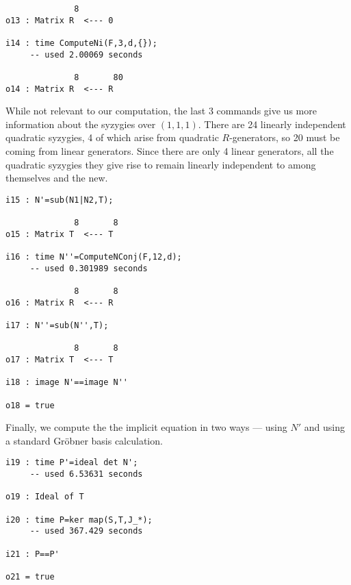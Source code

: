 \documentclass[fleqn,reqno]{amsart}
\begin{document}
\begin{example}[$\mt{ex601}$]
\begin{verbatim}
              8
o13 : Matrix R  <--- 0

i14 : time ComputeNi(F,3,d,{});
     -- used 2.00069 seconds

              8       80
o14 : Matrix R  <--- R
\end{verbatim}
While not relevant to our computation, the last 3 commands give us more information
about the syzygies over $(1,1,1)$.
There are 24 linearly independent quadratic syzygies,
4 of which arise from quadratic $R$-generators, so 20 must be coming from linear generators.
Since there are only 4 linear generators, all the quadratic syzygies they give rise to
remain linearly independent to among themselves and the new.

\begin{verbatim}
i15 : N'=sub(N1|N2,T);

              8       8
o15 : Matrix T  <--- T

i16 : time N''=ComputeNConj(F,12,d);
     -- used 0.301989 seconds

              8       8
o16 : Matrix R  <--- R

i17 : N''=sub(N'',T);

              8       8
o17 : Matrix T  <--- T

i18 : image N'==image N''

o18 = true
\end{verbatim}
Finally, we compute the the implicit equation in two ways --- using $N'$ and
using a standard Gr\"obner basis calculation.

\begin{verbatim}
i19 : time P'=ideal det N';
     -- used 6.53631 seconds

o19 : Ideal of T

i20 : time P=ker map(S,T,J_*);
     -- used 367.429 seconds

i21 : P==P'

o21 = true
\end{verbatim}
\end{example}
\end{document}

